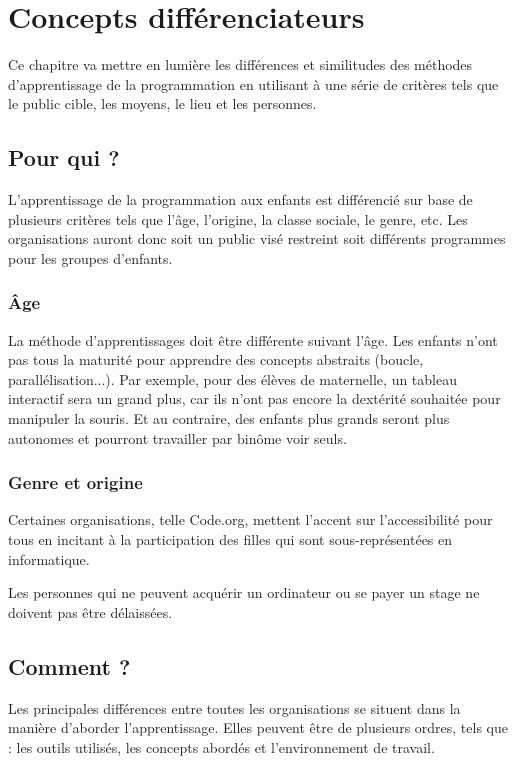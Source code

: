 ﻿\section{Concepts différenciateurs}
\label{concepts}
Ce chapitre va mettre en lumière les différences et similitudes des méthodes d'apprentissage de la programmation en utilisant à une série de critères tels que le public cible, les moyens, le lieu et les personnes.
\subsection{Pour qui ?}
L'apprentissage de la programmation aux enfants est différencié sur base de plusieurs critères tels que l'âge, l'origine, la classe sociale, le genre, etc. Les organisations auront donc soit un public visé restreint soit différents programmes pour les groupes d'enfants. 

\subsubsection{Âge}
La méthode d'apprentissages doit être différente suivant l'âge. Les enfants n'ont pas tous la maturité pour apprendre des concepts abstraits (boucle, parallélisation...). Par exemple, pour des élèves de maternelle, un tableau interactif sera un grand plus, car ils n'ont pas encore la dextérité souhaitée pour manipuler la souris. Et au contraire, des enfants plus grands seront plus autonomes et pourront travailler par binôme voir seuls.

\subsubsection{Genre et origine}
Certaines organisations, telle Code.org, mettent l'accent sur l’accessibilité pour tous en incitant à la participation des filles qui sont sous-représentées en informatique. 

Les personnes qui ne peuvent acquérir un ordinateur ou se payer un stage ne doivent pas être délaissées.

\subsection{Comment ?}
Les principales différences entre toutes les organisations se situent dans la manière d'aborder l'apprentissage. Elles peuvent être de plusieurs ordres, tels que : les outils utilisés, les concepts abordés et l'environnement de travail.

